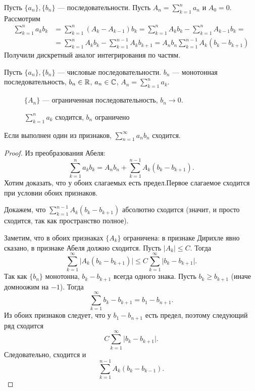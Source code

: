\begin{lm}
    Пусть $ \{a_n\}, \{b_n\}$ --- последовательности. Пусть $A_n = \sum_{k=1}^{n} a_n$ и $A_0 = 0$.
    Рассмотрим
	\[
    \begin{aligned}
	\sum_{k=1}^{n}  a_k b_k &= \sum_{k=1}^{n} (A_k - A_{k-1}) b_k = \sum_{k=1}^{n} A_kb_k - \sum_{k=1}^{n} A_{k-1}b_k = \\
							&= \sum_{k=1}^{n} A_k b_k - \sum_{k=1}^{n-1} A_k b_{k+1} = A_n b_n  \sum_{k=1}^{n-1} A_k(b_k-b_{k+1})
    \end{aligned}
\]
    Получили дискретный аналог интегрирования по частям.
\end{lm}

\begin{thm}
    Пусть $ \{a_n\}, \{b_n\}$ --- числовые последовательности.  $ b_n$ --- монотонная последовательность, $ b_n \in \mathbb{R}$, $a_n \in \mathbb{C}$, $ A_n = \sum_{k=1}^{n} a_k$.

\begin{description}
	\item[] $ \{A_n\} $ --- ограниченная последовательность, $ b_n \to  0$.
	\item[] $ \sum_{k=1}^{n} a_k $ сходится, $ b_n $ ограничено
\end{description}
Если выполнен один из признаков, $ \sum_{n=1}^{\infty} a_nb_n$ сходится.
\end{thm}
\begin{proof}
	 Из преобразования Абеля:
     \[
	 \sum_{k=1}^{n} a_k b_k = A_n b_n + \sum_{k=1}^{n-1} A_k (b_k - b_{k+1})
     .\] 
	 Хотим доказать, что у обоих слагаемых есть предел.Первое слагаемое сходится при условии обоих признаков. 

	 Докажем, что $ \sum_{k=1}^{n-1} A_k(b_k -b_{k+1})$ абсолютно сходится (значит, и просто сходится, так как пространство полное).

	 Заметим, что в обоих признаках $ \{A_k\}$ ограничена: в признаке Дирихле явно сказано, в признаке Абеля должно сходится. Пусть $ \lvert A_k \rvert  \le C$. 
	 Тогда
	 \[
		 \sum_{k=1}^{\infty} \lvert A_k(b_k - b_{k+1}) \rvert \le C \sum_{k=1}^{\infty} \lvert b_k - b_{k+1} \rvert 
	 .\] 
	 Так как $ \{b_n\}$ монотонна, $ b_k - b_{k+1}$ всегда одного знака. Пусть $ b_k \ge b_{k+1}$ (иначе домноожим на  $ -1$). 
	 Тогда 
	 \[
	 \sum_{k=1}^{\infty} b_k - b_{k+1} = b_1 - b_{n+1}
	 .\] 
	 Из обоих признаков следует, что у $ b_1 - b_{n+1}$ есть предел, поэтому следующий ряд сходится
	 \[
	 C \sum_{k=1}^{\infty} \lvert b_k - b_{k+1} \rvert 
	 .\] 
	 Следовательно, сходится и \[
		 \sum_{k=1}^{n-1} A_k(b_k-b_{k-1})
	 .\] 
\end{proof}

